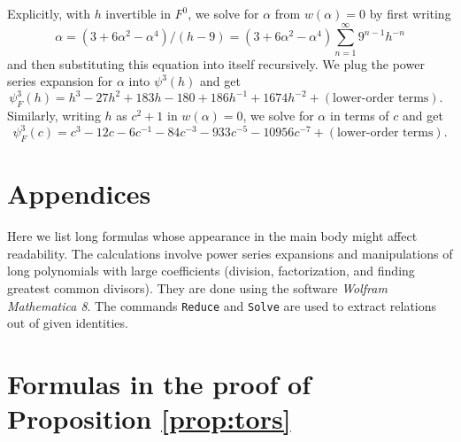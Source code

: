 \documentclass{gtpart}
\theoremstyle{definition}
\theoremstyle{remark}
\newcommand{\A}{\alpha}
\newcommand{\p}{\psi^3}
\numberwithin{equation}{section}
\numberwithin{thm}{section}
\begin{document}
Explicitly, with $h$ invertible in $F^0$, we solve for $\A$ from 
$w(\A) = 0$ by first writing 
\[
 \A = (3 + 6 \A^2 - \A^4) / (h - 9) 
 = (3 + 6 \A^2 - \A^4) \sum_{n = 1}^\infty 9^{n-1} h^{-n} 
\]
and then substituting this equation into itself recursively.  We plug 
the power series expansion for $\A$ into $\p(h)$ and get 
\[
 \psi_F^3(h) = h^3 - 27 h^2 + 183 h - 180 + 186 h^{-1} + 1674 h^{-2} 
 + (\text{lower-order terms}).  ~~~
\]
Similarly, writing $h$ as $c^2 + 1$ in $w(\A) = 0$, we solve for $\A$ in 
terms of $c$ and get 
\[
 \psi_F^3(c) = c^3 - 12 c - 6 c^{-1} - 84 c^{-3} - 933 c^{-5} 
 - 10956 c^{-7} + (\text{lower-order terms}).  
\]


\newpage
\appendix
\section*{Appendices}

Here we list long formulas whose appearance in the main body might 
affect readability.  The calculations involve power series expansions 
and manipulations of long polynomials with large coefficients (division, 
factorization, and finding greatest common divisors).  They are done 
using the software {\em Wolfram Mathematica 8}.  The commands 
\texttt{Reduce} and \texttt{Solve} are used to extract relations out of 
given identities.  


\section{Formulas in the proof of Proposition \ref{prop:tors}}
\label{apx:tors}
\end{document}
